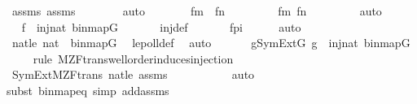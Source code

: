 \begin{isabellebody}
\ assms\ assms{}\isanewline
\ \ \ \ \ \ \isamarkupfalse%
\ auto\isanewline
\ \ \ \ \isamarkupfalse%
\ \isamarkupfalse%
\ {\isachardoublequoteopen}f{\isacharbackquote}{\kern0pt}m\ {\isasymnoteq}\ f{\isacharbackquote}{\kern0pt}n{\isachardoublequoteclose}\ \isanewline
\ \ \ \ \ \ \isamarkupfalse%
\ fm\ fn\ \isanewline
\ \ \ \ \ \ \isamarkupfalse%
\ auto\isanewline
\ \ \isamarkupfalse%
\isanewline
\ \ \isamarkupfalse%
\ \isamarkupfalse%
\ {\isachardoublequoteopen}f\ {\isasymin}\ inj{\isacharparenleft}{\kern0pt}nat{\isacharcomma}{\kern0pt}\ binmap{\isacharparenleft}{\kern0pt}G{\isacharparenright}{\kern0pt}{\isacharparenright}{\kern0pt}{\isachardoublequoteclose}\ \isanewline
\ \ \ \ \isamarkupfalse%
\ inj{\isacharunderscore}{\kern0pt}def\ \isanewline
\ \ \ \ \isamarkupfalse%
\ fpi\isanewline
\ \ \ \ \isamarkupfalse%
\ auto\isanewline
\ \ \isamarkupfalse%
\ \isamarkupfalse%
\ natle{\isacharcolon}{\kern0pt}\ {\isachardoublequoteopen}nat\ {\isasymlesssim}\ binmap{\isacharparenleft}{\kern0pt}G{\isacharparenright}{\kern0pt}{\isachardoublequoteclose}\ \isamarkupfalse%
\ lepoll{\isacharunderscore}{\kern0pt}def\ \isamarkupfalse%
\ auto\isanewline
\ \ \isanewline
\ \ \isamarkupfalse%
\ {\isachardoublequoteopen}{\isasymexists}g{\isasymin}SymExt{\isacharparenleft}{\kern0pt}G{\isacharparenright}{\kern0pt}{\isachardot}{\kern0pt}\ g\ {\isasymin}\ inj{\isacharparenleft}{\kern0pt}nat{\isacharcomma}{\kern0pt}\ binmap{\isacharparenleft}{\kern0pt}G{\isacharparenright}{\kern0pt}{\isacharparenright}{\kern0pt}{\isachardoublequoteclose}\isanewline
\ \ \ \ \isamarkupfalse%
{\isacharparenleft}{\kern0pt}rule\ M{\isacharunderscore}{\kern0pt}ZF{\isacharunderscore}{\kern0pt}trans{\isachardot}{\kern0pt}wellorder{\isacharunderscore}{\kern0pt}induces{\isacharunderscore}{\kern0pt}injection{\isacharparenright}{\kern0pt}\isanewline
\ \ \ \ \isamarkupfalse%
\ SymExt{\isacharunderscore}{\kern0pt}M{\isacharunderscore}{\kern0pt}ZF{\isacharunderscore}{\kern0pt}trans\ natle\ assms\ \isanewline
\ \ \ \ \ \ \ \ \isamarkupfalse%
\ auto{\isacharbrackleft}{\kern0pt}{}{\isacharbrackright}{\kern0pt}\isanewline
\ \ \ \ \isamarkupfalse%
{\isacharparenleft}{\kern0pt}subst\ binmap{\isacharunderscore}{\kern0pt}eq{\isacharcomma}{\kern0pt}\ simp\ add{\isacharcolon}{\kern0pt}assms{\isacharparenright}{\kern0pt}\isanewline

\end{isabellebody}
